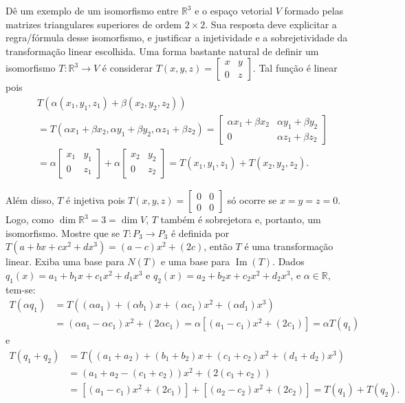 \documentclass[12pt,a4paper]{article}
\newcommand*\R{\mathbb{R}}
\begin{document}
\begin{ExerciseList}
\Exercise[title={2,5}] Dê um exemplo de um isomorfismo entre $\R^3$ e o espaço vetorial $V$ formado pelas matrizes triangulares superiores de ordem $2 \times 2$. Sua resposta deve explicitar a regra/fórmula desse isomorfismo, e justificar a injetividade e a sobrejetividade da transformação linear escolhida.
\Answer Uma forma bastante natural de definir um isomorfismo $T: \R^3 \to V$ é considerar $T(x,y,z) = \begin{bmatrix}
x & y\\0 & z
\end{bmatrix}$. Tal função é linear pois
\begin{align*}
&T( \alpha(x_1,y_1,z_1) + \beta(x_2,y_2,z_2) )\\
& = T( \alpha x_1+\beta x_2, \alpha y_1+\beta y_2, \alpha z_1+\beta z_2)
=
\begin{bmatrix}
\alpha x_1+\beta x_2 & \alpha y_1+\beta y_2 \\0 & \alpha z_1+\beta z_2
\end{bmatrix}\\
& =
\alpha
\begin{bmatrix}
x_1 & y_1\\0&z_1
\end{bmatrix}
+\alpha
\begin{bmatrix}
x_2 & y_2\\0&z_2
\end{bmatrix}
=T(x_1,y_1,z_1)+T(x_2,y_2,z_2).
\end{align*}

Além disso, $T$ é injetiva pois $T(x,y,z) = \begin{bmatrix}
0& 0\\0&0
\end{bmatrix}$ só ocorre se $x=y=z=0$. Logo, como $\dim{ \R^3 } = 3 = \dim{ V }$, $T$ também é sobrejetora e, portanto, um isomorfismo.
\Exercise[title={2,5}] Mostre que se $T: P_3 \to P_3$ é definida por $T(a+bx+cx^2+dx^3) = (a-c)x^2+(2c)$, então $T$ é uma transformação linear. Exiba uma base para $N(T)$ e uma base para $\operatorname{Im}(T)$.
\Answer  Dados $q_1(x) = a_1+b_1x+c_1x^2+d_1x^3$ e $q_2(x) = a_2+b_2x+c_2x^2+d_2x^3$, e $\alpha \in \R$, tem-se:
\begin{align*}
T(\alpha q_1)
&= T((\alpha a_1)+(\alpha b_1)x+(\alpha c_1)x^2+(\alpha d_1)x^3)\\
&= (\alpha a_1- \alpha c_1)x^2+(2 \alpha c_1)
= \alpha [(a_1- c_1)x^2+(2 c_1)]
=\alpha T(q_1)
\end{align*}
e
\begin{align*}
T(q_1+q_2)
&= T((a_1 + a_2)+(b_1+b_2)x+(c_1+c_2)x^2+(d_1+d_2)x^3)\\
&= (a_1+a_2 - (c_1+c_2))x^2+(2 (c_1+c_2))\\
& = [(a_1- c_1)x^2+(2 c_1)] + [(a_2- c_2)x^2+(2 c_2)]
 = T(q_1)+ T(q_2).
\end{align*}


\end{ExerciseList}
\end{document}
